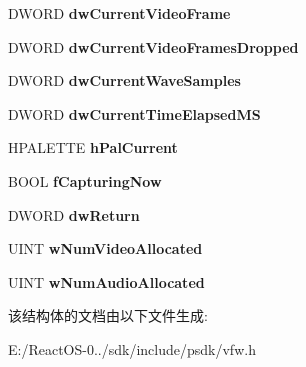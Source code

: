 \begin{DoxyCompactItemize}
\item 
\mbox{\label{structtag_cap_status_a14676c53ffb988cf0eea86fa830daa72}} 
D\+W\+O\+RD {\bfseries dw\+Current\+Video\+Frame}
\item 
\mbox{\label{structtag_cap_status_a144a73e61dd83ed472f01dce022b4301}} 
D\+W\+O\+RD {\bfseries dw\+Current\+Video\+Frames\+Dropped}
\item 
\mbox{\label{structtag_cap_status_afb366181536495c65492705f78da8f2a}} 
D\+W\+O\+RD {\bfseries dw\+Current\+Wave\+Samples}
\item 
\mbox{\label{structtag_cap_status_a7e195410e5fbc37cd93962d33ffec1e0}} 
D\+W\+O\+RD {\bfseries dw\+Current\+Time\+Elapsed\+MS}
\item 
\mbox{\label{structtag_cap_status_a8f2946d02f62b4c07b0920e7c88f5271}} 
H\+P\+A\+L\+E\+T\+TE {\bfseries h\+Pal\+Current}
\item 
\mbox{\label{structtag_cap_status_a429aadc7d301e87421a4f7250e533c3d}} 
B\+O\+OL {\bfseries f\+Capturing\+Now}
\item 
\mbox{\label{structtag_cap_status_a1cf2215a3802cb927c5e54e37d8dc8dc}} 
D\+W\+O\+RD {\bfseries dw\+Return}
\item 
\mbox{\label{structtag_cap_status_a3ec7ac62c6addd03d2ec1b261622f414}} 
U\+I\+NT {\bfseries w\+Num\+Video\+Allocated}
\item 
\mbox{\label{structtag_cap_status_ac31d066f6041675d9f6d91efc76bddbb}} 
U\+I\+NT {\bfseries w\+Num\+Audio\+Allocated}
\end{DoxyCompactItemize}


该结构体的文档由以下文件生成\+:\begin{DoxyCompactItemize}
\item 
E\+:/\+React\+O\+S-\/0../sdk/include/psdk/vfw.\+h\end{DoxyCompactItemize}
